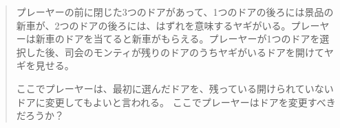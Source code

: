 \begin{quotation}
	プレーヤーの前に閉じた3つのドアがあって、1つのドアの後ろには景品の新車が、2つのドアの後ろには、はずれを意味するヤギがいる。プレーヤーは新車のドアを当てると新車がもらえる。プレーヤーが1つのドアを選択した後、司会のモンティが残りのドアのうちヤギがいるドアを開けてヤギを見せる。

	ここでプレーヤーは、最初に選んだドアを、残っている開けられていないドアに変更してもよいと言われる。
	ここでプレーヤーはドアを変更すべきだろうか？
\end{quotation}
